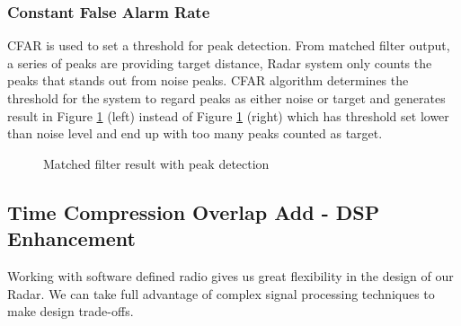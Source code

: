 \documentclass[letterpaper, 12 pt, conference]{report}
\numberwithin{figure}{section}
\begin{document}
\subsubsection{Constant False Alarm Rate}
CFAR is used to set a threshold for peak detection. From matched filter output, a series of peaks are providing target distance, Radar system only counts the peaks that stands out from noise peaks. CFAR algorithm determines the threshold for the system to regard peaks as either noise or target and generates result in Figure \ref{fig:th} (left) instead of Figure \ref{fig:th} (right) which has threshold set lower than noise level and end up with too many peaks counted as target.
\begin{figure}[h]
\noindent{}
\noindent{}
\caption{Matched filter result with peak detection}
\label{fig:th}
\end{figure}
\FloatBarrier
\subsection{Time Compression Overlap Add - DSP Enhancement}
Working with software defined radio gives us great flexibility in the design of our Radar. We can take full advantage of complex signal processing techniques to make design trade-offs. \\
\end{document}
